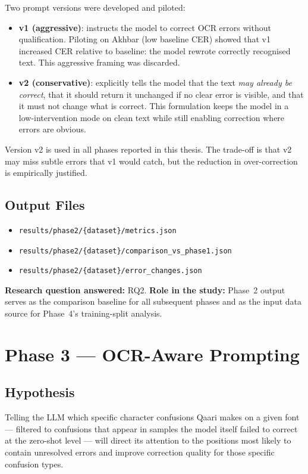 Two prompt versions were developed and piloted:
\begin{itemize}
  \item \textbf{v1 (aggressive)}: instructs the model to correct OCR errors
        without qualification. Piloting on Akhbar (low baseline CER) showed
        that v1 increased CER relative to baseline: the model rewrote
        correctly recognised text. This aggressive framing was discarded.
  \item \textbf{v2 (conservative)}: explicitly tells the model that the text
        \emph{may already be correct}, that it should return it unchanged if
        no clear error is visible, and that it must not change what is
        correct. This formulation keeps the model in a low-intervention mode
        on clean text while still enabling correction where errors are obvious.
\end{itemize}
Version v2 is used in all phases reported in this thesis. The trade-off is
that v2 may miss subtle errors that v1 would catch, but the reduction in
over-correction is empirically justified.

\subsection{Output Files}
\begin{itemize}
  \item \texttt{results/phase2/\{dataset\}/metrics.json}
  \item \texttt{results/phase2/\{dataset\}/comparison\_vs\_phase1.json}
  \item \texttt{results/phase2/\{dataset\}/error\_changes.json}
\end{itemize}

\noindent
\textbf{Research question answered:} RQ2.
\textbf{Role in the study:} Phase~2 output serves as the comparison baseline
for all subsequent phases and as the input data source for Phase~4's
training-split analysis.

\section{Phase 3 --- OCR-Aware Prompting}
\label{sec:phase3}

\subsection{Hypothesis}
Telling the LLM which specific character confusions Qaari makes on a given
font --- filtered to confusions that appear in samples the model itself
failed to correct at the zero-shot level --- will direct its attention to
the positions most likely to contain unresolved errors and improve correction
quality for those specific confusion types.

